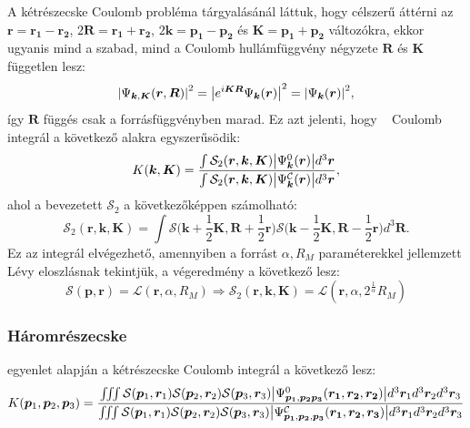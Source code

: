 \documentclass[10pt,a4paper]{article}
\numberwithin{equation}{subsection}
\numberwithin{figure}{section}
\begin{document}
A kétrészecske Coulomb probléma tárgyalásánál láttuk, hogy célszerű áttérni az $\bm{r}=\bm{r_1}-\bm{r_2}$, $2\bm{R}=\bm{r_1}+\bm{r_2}$, $2\bm{k}=\bm{p_1}-\bm{p_2}$ és $\bm{K}=\bm{p_1}+\bm{p_2}$ változókra, ekkor ugyanis mind a szabad, mind a Coulomb hullámfüggvény négyzete $\bm{R}$ és  $\bm{K}$ független lesz:
\begin{equation}
\abs{\Psi_{\bm{k},\bm{K}}(\bm{r},\bm{R})}^2 = \abs{e^{i\bm{KR}}\Psi_{\bm{k}}(\bm{r})}^2=\abs{\Psi_{\bm{k}}(\bm{r})}^2,
\end{equation}
így $\bm{R}$ függés csak a forrásfüggvényben marad. Ez azt jelenti, hogy ~ Coulomb integrál a következő alakra egyszerűsödik:
\begin{equation}
K(\bm{k},\bm{K})=
\frac{
\int \mathcal{S}_2(\bm{r}, \bm{k}, \bm{K})
\abs{\Psi^{0}_{\bm{k}}(\bm{r})} d^3 \bm{r}
}{\int \mathcal{S}_2(\bm{r}, \bm{k}, \bm{K})
\abs{\Psi^{\mathcal{C}}_{\bm{k}}(\bm{r})} d^3 \bm{r}},
\label{eq:K2}
\end{equation}
ahol a bevezetett $\mathcal{S}_2$ a következőképpen számolható:
\begin{equation}
\mathcal{S}_2(\bm{r}, \bm{k},\bm{K}) = \int \mathcal{S}\Big(\bm{k}+\frac{1}{2}\bm{K}, \bm{R}+\frac{1}{2}\bm{r}\Big)\mathcal{S}\Big(\bm{k}-\frac{1}{2}\bm{K}, \bm{R}-\frac{1}{2}\bm{r}\Big)d^3\bm{R}.
\end{equation}
Ez az integrál elvégezhető, amennyiben a forrást $\alpha, R_M$ paraméterekkel jellemzett Lévy eloszlásnak tekintjük, a végeredmény a következő lesz:
\begin{equation}
\mathcal{S}(\bm{p},\bm{r})=\mathcal{L}(\bm{r},\alpha,R_M)\Longrightarrow \mathcal{S}_2(\bm{r},\bm{k},\bm{K})=\mathcal{L}(\bm{r}, \alpha, 2^{\frac{1}{\alpha}}R_M)
\end{equation}
\subsubsection{Háromrészecske}
 egyenlet alapján a kétrészecske Coulomb integrál a következő lesz:
\begin{equation}
K(\bm{p}_1,\bm{p}_2,\bm{p}_3)=
\frac{
\iiint 
\mathcal{S}(\bm{p}_1, \bm{r}_1)\mathcal{S}(\bm{p}_2, \bm{r}_2)\mathcal{S}(\bm{p}_3, \bm{r}_3)
\abs{\Psi^{0}_{\bm{p_1},\bm{p_2}\bm{p_3}}(\bm{r_1},\bm{r_2},\bm{r_2})} d^3 \bm{r}_1d^3 \bm{r}_2d^3 \bm{r}_3
}{\iiint
\mathcal{S}(\bm{p}_1, \bm{r}_1)\mathcal{S}(\bm{p}_2, \bm{r}_2)\mathcal{S}(\bm{p}_3, \bm{r}_3)
\abs{\Psi^\mathcal{C}_{\bm{p_1},\bm{p_2},\bm{p_3}}(\bm{r_1},\bm{r_2},\bm{r_3})}d^3 \bm{r}_1d^3 \bm{r}_2d^3 \bm{r}_3}
\label{eq:Kn3}
\end{equation}
\end{document}

